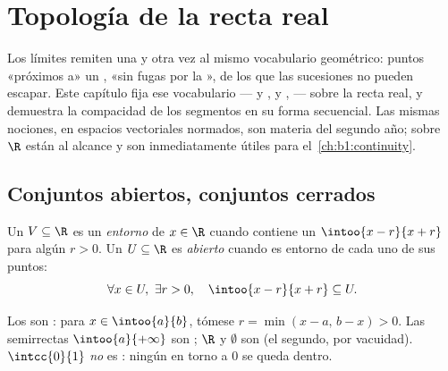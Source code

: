 \chapter{Topología de la recta real}\label{ch:b1:topology}

Los límites remiten una y otra vez al mismo vocabulario geométrico:
puntos «próximos a» un ,  «sin fugas por la
»,  de los que las sucesiones no pueden escapar.
Este capítulo fija ese vocabulario ---  y
,  y ,  --- sobre la recta real,
y demuestra la compacidad de los segmentos en su forma secuencial. Las
mismas nociones, en espacios vectoriales normados, son materia del
segundo año; sobre $\R$ están al alcance y son inmediatamente útiles
para el~\cref{ch:b1:continuity}.

\section{Conjuntos abiertos, conjuntos cerrados}

\begin{definition}\label{def:b1:topology:open}
Un  $V \subseteq \R$ es un \emph{entorno} de
$x \in \R$ cuando contiene un  $\intoo{x - r}{x + r}$ para
algún $r > 0$. Un  $U \subseteq \R$ es
\emph{abierto} cuando es entorno de cada uno de
sus puntos:
\[
\forall x \in U,\ \exists r > 0, \quad \intoo{x - r}{x + r}
\subseteq U .
\]
\end{definition}

\begin{example}\label{ex:b1:topology:open}
Los   son : para $x \in \intoo{a}{b}$,
tómese $r = \min(x - a,\, b - x) > 0$. Las semirrectas
$\intoo{a}{+\infty}$ son ; $\R$ y $\emptyset$ son 
(el segundo, por vacuidad). $\intcc{0}{1}$ \emph{no} es :
ningún  en torno a $0$ se queda dentro.
\end{example}

